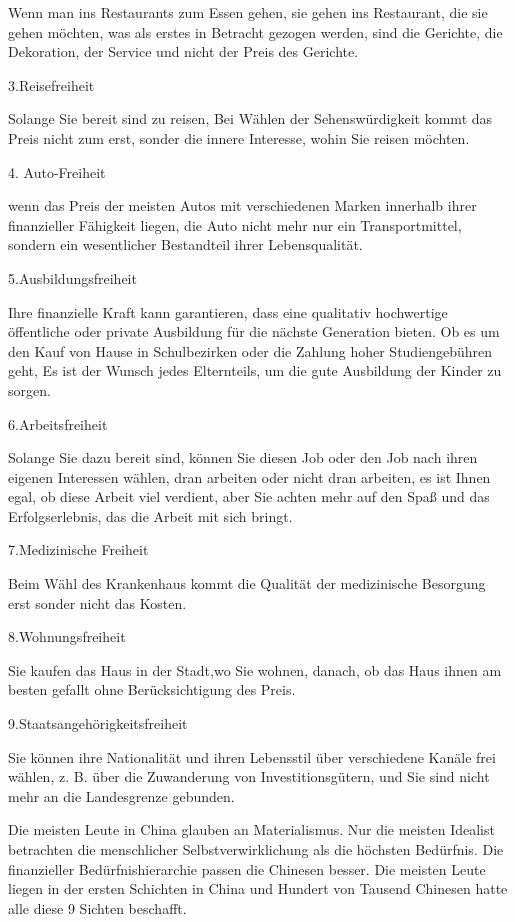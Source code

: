 \documentclass[11pt,a4paper]{article}
\begin{document}
Wenn man ins Restaurants zum Essen gehen, sie gehen ins  Restaurant, die  sie
gehen möchten, was als erstes in Betracht gezogen werden, sind die Gerichte,
die Dekoration, der Service und nicht der Preis des Gerichte.

3.Reisefreiheit

Solange Sie bereit sind zu reisen,  Bei Wählen der Sehenswürdigkeit  kommt
das Preis nicht zum erst, sonder die innere Interesse, wohin Sie reisen
möchten.

4. Auto-Freiheit

wenn das Preis der meisten Autos mit verschiedenen Marken innerhalb ihrer
finanzieller Fähigkeit liegen, die Auto nicht mehr nur ein Transportmittel,
sondern ein wesentlicher Bestandteil ihrer Lebensqualität.

5.Ausbildungsfreiheit

Ihre finanzielle Kraft kann garantieren, dass eine qualitativ hochwertige
öffentliche oder private Ausbildung für die nächste Generation bieten. Ob es
um den Kauf von Hause in Schulbezirken oder die Zahlung hoher Studiengebühren
geht, Es ist der Wunsch jedes Elternteils, um die gute Ausbildung der Kinder
zu sorgen.

6.Arbeitsfreiheit

Solange Sie dazu bereit sind, können Sie diesen Job oder den Job nach ihren
eigenen Interessen wählen, dran arbeiten oder nicht dran arbeiten, es ist
Ihnen egal, ob diese Arbeit viel verdient, aber Sie achten mehr auf den Spaß
und das Erfolgserlebnis, das die Arbeit mit sich bringt.

7.Medizinische Freiheit

Beim Wähl des Krankenhaus kommt die Qualität der medizinische Besorgung erst
sonder nicht das Kosten.

8.Wohnungsfreiheit

Sie kaufen das Haus in der Stadt,wo Sie wohnen, danach, ob das Haus ihnen am
besten gefallt ohne Berücksichtigung des Preis.

9.Staatsangehörigkeitsfreiheit

Sie können ihre Nationalität und ihren Lebensstil über verschiedene Kanäle
frei wählen, z. B. über die Zuwanderung von Investitionsgütern, und Sie sind
nicht mehr an die Landesgrenze gebunden. 

Die meisten Leute in China glauben an Materialismus. Nur die meisten Idealist
betrachten die menschlicher Selbstverwirklichung als die höchsten
Bedürfnis. Die finanzieller Bedürfnishierarchie passen die Chinesen
besser. Die meisten Leute liegen in der ersten Schichten in China und Hundert
von Tausend Chinesen hatte alle diese 9 Sichten beschafft. 
\end{document}
